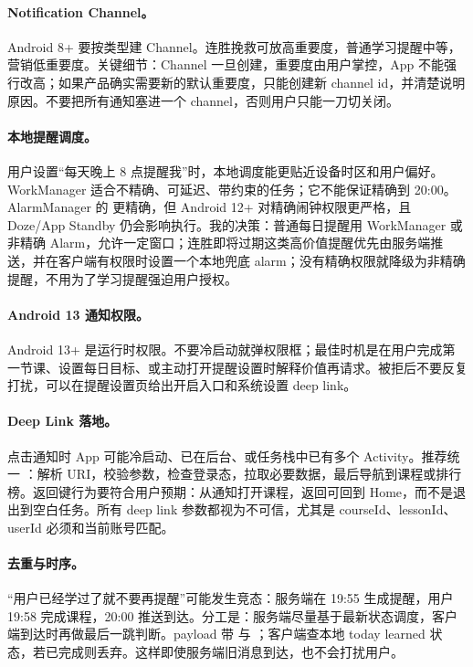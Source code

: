 \paragraph{Notification Channel。} Android 8+ 要按类型建 Channel。\srcinferred 连胜挽救可放高重要度，普通学习提醒中等，营销低重要度。关键细节：Channel 一旦创建，重要度由用户掌控，App 不能强行改高；如果产品确实需要新的默认重要度，只能创建新 channel id，并清楚说明原因。不要把所有通知塞进一个 channel，否则用户只能一刀切关闭。

\paragraph{本地提醒调度。} 用户设置“每天晚上 8 点提醒我”时，本地调度能更贴近设备时区和用户偏好。\srcinferred WorkManager 适合不精确、可延迟、带约束的任务；它不能保证精确到 20:00。AlarmManager 的  更精确，但 Android 12+ 对精确闹钟权限更严格，且 Doze/App Standby 仍会影响执行。我的决策：普通每日提醒用 WorkManager 或非精确 Alarm，允许一定窗口；连胜即将过期这类高价值提醒优先由服务端推送，并在客户端有权限时设置一个本地兜底 alarm；没有精确权限就降级为非精确提醒，不用为了学习提醒强迫用户授权。

\paragraph{Android 13 通知权限。} Android 13+  是运行时权限。\srcinferred 不要冷启动就弹权限框；最佳时机是在用户完成第一节课、设置每日目标、或主动打开提醒设置时解释价值再请求。被拒后不要反复打扰，可以在提醒设置页给出开启入口和系统设置 deep link。

\paragraph{Deep Link 落地。} 点击通知时 App 可能冷启动、已在后台、或任务栈中已有多个 Activity。\srcinferred 推荐统一 ：解析 URI，校验参数，检查登录态，拉取必要数据，最后导航到课程或排行榜。返回键行为要符合用户预期：从通知打开课程，返回可回到 Home，而不是退出到空白任务。所有 deep link 参数都视为不可信，尤其是 courseId、lessonId、userId 必须和当前账号匹配。

\paragraph{去重与时序。} “用户已经学过了就不要再提醒”可能发生竞态：服务端在 19:55 生成提醒，用户 19:58 完成课程，20:00 推送到达。\srcinferred 分工是：服务端尽量基于最新状态调度，客户端到达时再做最后一跳判断。payload 带  与 ；客户端查本地 today learned 状态，若已完成则丢弃。这样即使服务端旧消息到达，也不会打扰用户。

